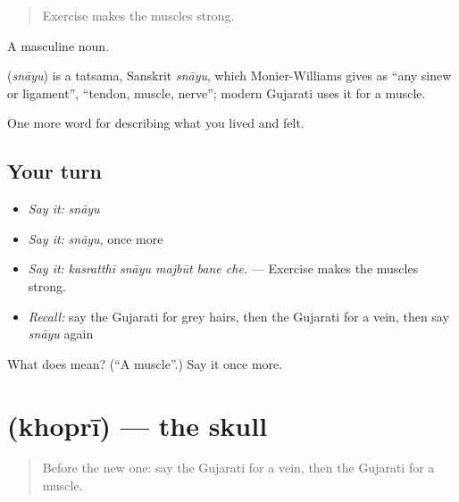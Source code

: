 \begin{quote}
Exercise makes the muscles strong.
\end{quote}

A masculine noun.

\begin{cousinweb}
\textbf{} (\emph{snāyu}) is a tatsama, Sanskrit \emph{snāyu}, which Monier-Williams gives as \textquotedblleft{}any sinew or ligament\textquotedblright{}, \textquotedblleft{}tendon, muscle, nerve\textquotedblright{}; modern Gujarati uses it for a muscle.
\end{cousinweb}

\begin{grammarlens}[title={What you've built}]
One more word for describing what you lived and felt.
\end{grammarlens}

\subsection*{Your turn}
\begin{itemize}
\raggedright
  \item \emph{Say it:} \emph{snāyu}
  \item \emph{Say it:} \emph{snāyu}, once more
  \item \emph{Say it:} \emph{kasratthī snāyu majbūt bane che.} — Exercise makes the muscles strong.
  \item \emph{Recall:} say the Gujarati for grey hairs, then the Gujarati for a vein, then say \emph{snāyu} again
\end{itemize}

\begin{tcolorbox}[breakable,colback=teal!4,colframe=teal!35!black,title={Before you move on}]
What does  mean? (\textquotedblleft{}A muscle\textquotedblright{}.) Say it once more.
\end{tcolorbox}
\section[\texorpdfstring{\gu{ખોપરી} (khoprī)}{ખોપરી (khoprī)}]{ (khoprī) — the skull}

\label{lesson:GU-C472-khopri}



\begin{quote}
Before the new one: say the Gujarati for a vein, then the Gujarati for a muscle.
\end{quote}

